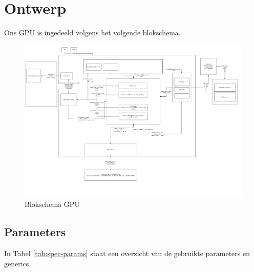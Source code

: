 \documentclass{scrreprt} %
\date{22 november 2013}
\begin{document}
\chapter{Ontwerp}
Ons GPU is ingedeeld volgens het volgende blokschema.
\begin{figure}[H]
\centering
        \includegraphics[width=\linewidth]{resources/systeemdrawing-rc.pdf}
        \caption{Blokschema GPU}
        \label{fig:Blokschema GPU}
\end{figure}

\section{Parameters}
In Tabel \ref{tab:spec-params} staat een overzicht van de gebruikte parameters en generics.
\end{document}
